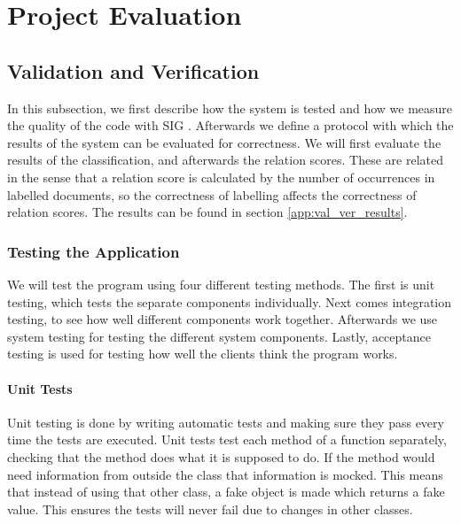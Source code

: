 \chapter{Project Evaluation}


\todo{}

\section{Validation and Verification}
In this subsection, we first describe how the system is tested and how we measure the quality of the code with SIG \cite{sig}. Afterwards we define a protocol with which the results of the system can be evaluated for correctness. We will first evaluate the results of the classification, and afterwards the relation scores. These are related in the sense that a relation score is calculated by the number of occurrences in labelled documents, so the correctness of labelling affects the correctness of relation scores. The results can be found in section \ref{app:val_ver_results}.\\

\subsection{Testing the Application}
We will test the program using four different testing methods. The first is unit testing, which tests the separate components individually. Next comes integration testing, to see how well different components work together. Afterwards we use system testing for testing the different system components. Lastly, acceptance testing is used for testing how well the clients think the program works.

\subsubsection{Unit Tests}
Unit testing is done by writing automatic tests and making sure they pass every time the tests are executed. Unit tests test each method of a function separately, checking that the method does what it is supposed to do. If the method would need information from outside the class that information is mocked. This means that instead of using that other class, a fake object is made which returns a fake value. This ensures the tests will never fail due to changes in other classes.

